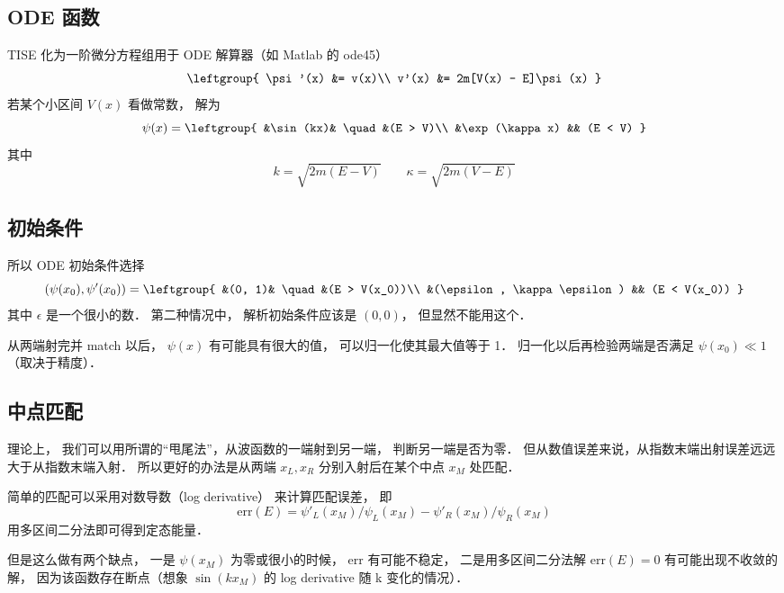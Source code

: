 
\subsection{ODE 函数}
TISE 化为一阶微分方程组用于 ODE 解算器（如 Matlab 的 ode45）
\begin{equation}
\leftgroup{
\psi'(x) &= v(x)\\
v'(x) &= 2m[V(x) - E]\psi(x)
}\end{equation}
若某个小区间 $V(x)$ 看做常数， 解为
\begin{equation}
\psi(x) = \leftgroup{
&\sin(kx)& \quad &(E > V)\\
&\exp(\kappa x) && (E < V)
}\end{equation}
其中
\begin{equation}
k = \sqrt{2m(E - V)} \qquad
\kappa = \sqrt{2m(V - E)}
\end{equation}

\subsection{初始条件}
所以 ODE  初始条件选择
\begin{equation}
(\psi(x_0), \psi'(x_0)) = \leftgroup{
&(0, 1)& \quad &(E > V(x_0))\\
&(\epsilon, \kappa\epsilon) && (E < V(x_0))
}\end{equation}
其中 $\epsilon$ 是一个很小的数． 第二种情况中， 解析初始条件应该是 $(0, 0)$， 但显然不能用这个．

从两端射完并 match 以后， $\psi(x)$ 有可能具有很大的值， 可以归一化使其最大值等于 1． 归一化以后再检验两端是否满足 $\psi(x_0) \ll 1$（取决于精度）．

\subsection{中点匹配}
理论上， 我们可以用所谓的“甩尾法”，从波函数的一端射到另一端， 判断另一端是否为零． 但从数值误差来说，从指数末端出射误差远远大于从指数末端入射． 所以更好的办法是从两端 $x_L, x_R$ 分别入射后在某个中点 $x_M$ 处匹配．

简单的匹配可以采用对数导数（log derivative） 来计算匹配误差， 即
\begin{equation}
\text{err}(E) = \psi'_L(x_M)/\psi_L(x_M) - \psi'_R(x_M)/\psi_R(x_M)
\end{equation}
用多区间二分法即可得到定态能量．

但是这么做有两个缺点， 一是 $\psi(x_M)$ 为零或很小的时候， err 有可能不稳定， 二是用多区间二分法解 $\text{err}(E) = 0$ 有可能出现不收敛的解， 因为该函数存在断点（想象 $\sin(k x_M)$ 的 log derivative 随 k 变化的情况）．

